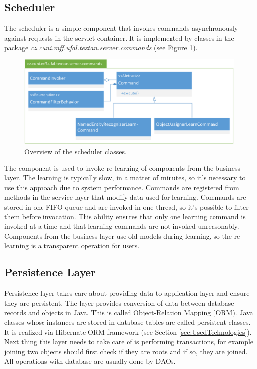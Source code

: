 \subsection{Scheduler}
The scheduler is a simple component that invokes commands asynchronously against
requests in the servlet container. It is implemented by classes in the package
\emph{cz.\-cuni.\-mff.\-ufal.\-textan.\-server.\-commands} (see Figure
\ref{fig:CommandsOverview}).

\begin{figure}[!htb]
        \centering
        \includegraphics[width=\textwidth]{Images/Commands}
        \caption{Overview of the scheduler classes.}
        \label{fig:CommandsOverview}
\end{figure}

The component is used to invoke re-learning of components from the business
layer. The learning is typically slow, in a matter of minutes, so it's necessary
to use this approach due to system performance. Commands are registered from
methods in the service layer that modify data used for learning. Commands are
stored in one FIFO queue and are invoked in one thread, so it's possible to
filter them before invocation. This ability ensures that only one learning
command is invoked at a time and that learning commands are not invoked
unreasonably. Components from the business layer use old models during learning,
so the re-learning is a transparent operation for users.

\subsection{Persistence Layer}
\label{sec:PersistentLayer}

Persistence layer takes care about providing data to application layer and
ensure they are persistent. The layer provides conversion of data between database
records and objects in Java. This is called Object-Relation Mapping
(ORM). Java classes whose instances are stored in database tables are called
persistent classes. It is realized via Hibernate ORM framework (see Section
\ref{sec:UsedTechnologies}). Next thing this layer needs to take care of is performing transactions,
for example joining two objects should first check if they are roots and if so, they
are joined. All operations with database are usually done by DAOs.

